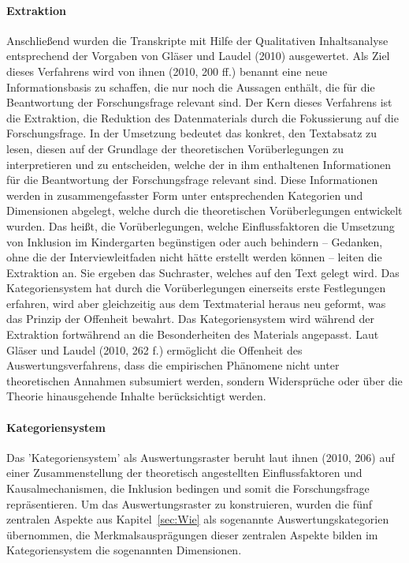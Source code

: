 \paragraph{Extraktion} Anschließend wurden die Transkripte mit Hilfe der Qualitativen Inhaltsanalyse entsprechend der Vorgaben von Gläser und Laudel (2010) ausgewertet. Als Ziel dieses Verfahrens wird von ihnen (2010, 200 ff.) benannt eine neue Informationsbasis zu schaffen, die nur noch die Aussagen enthält, die für die Beantwortung der Forschungsfrage relevant sind. Der Kern dieses Verfahrens ist die Extraktion, die Reduktion des Datenmaterials durch die Fokussierung auf die Forschungsfrage. In der Umsetzung bedeutet das konkret, den Textabsatz zu lesen, diesen auf der Grundlage der theoretischen Vorüberlegungen zu interpretieren und zu entscheiden, welche der in ihm enthaltenen Informationen für die Beantwortung der Forschungsfrage relevant sind. Diese Informationen werden in zusammengefasster Form unter entsprechenden Kategorien und Dimensionen abgelegt, welche durch die theoretischen Vorüberlegungen entwickelt wurden. Das heißt, die Vorüberlegungen, welche Einflussfaktoren die Umsetzung von Inklusion im Kindergarten begünstigen oder auch behindern -- Gedanken, ohne die der Interviewleitfaden nicht hätte erstellt werden können -- leiten die Extraktion an. Sie ergeben das Suchraster, welches auf den Text gelegt wird. Das Kategoriensystem hat durch die Vorüberlegungen einerseits erste Festlegungen erfahren, wird aber gleichzeitig aus dem Textmaterial heraus neu geformt, was das Prinzip der Offenheit bewahrt. Das Kategoriensystem wird während der Extraktion fortwährend an die Besonderheiten des Materials angepasst. Laut Gläser und Laudel (2010, 262 f.) ermöglicht die Offenheit des Auswertungsverfahrens, dass die empirischen Phänomene nicht unter theoretischen Annahmen subsumiert werden, sondern Widersprüche oder über die Theorie hinausgehende Inhalte berücksichtigt werden.

\paragraph{Kategoriensystem}
Das ’Kategoriensystem’ als Auswertungsraster beruht laut ihnen (2010, 206) auf einer Zusammenstellung der theoretisch angestellten Einflussfaktoren und Kausalmechanismen, die Inklusion bedingen und somit die Forschungsfrage repräsentieren. Um das Auswertungsraster zu konstruieren, wurden die fünf zentralen Aspekte aus Kapitel~\ref{sec:Wie} als sogenannte Auswertungskategorien übernommen, die Merkmalsausprägungen dieser zentralen Aspekte bilden im Kategoriensystem die sogenannten Dimensionen. 


